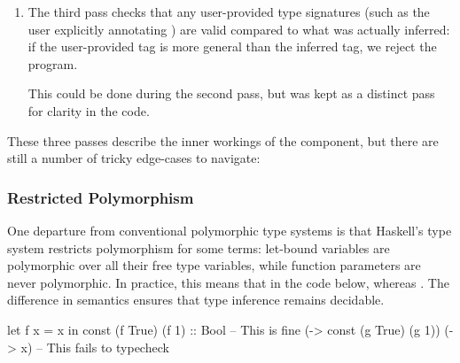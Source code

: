 \documentclass[dissertation.tex]{subfiles}
\begin{document}
{{\begin{enumerate}
{            This can't be done efficiently during the first pass: consider the expression  where the \(t_i\) are type variables tagging the expressions. Assume we have inferred that  and \haskell{(+) :: #\(\beta\rightarrow\beta\rightarrow\beta\)#} as described above, and that we have unified \(t_1\) and \(t_2\) with these types respectively. Inferring the type of the overall expression would proceed by unifying the type of the first formal argument of the function (\(\beta\)) with the first actual argument (\(\alpha\)), and then using this substitution to type the return value of the function as \(\alpha\rightarrow\alpha\rightarrow\alpha\), which we can now unify with \(t_3\). Had we previously updated the subterm's tags to be their inferred concrete types we would now have to update them again: \(\beta\) is no longer used as it's been unified with \(\alpha\), but our subterms may still contains uses of it.
        }
        \item
        {
            The third pass checks that any user-provided type signatures (such as the user explicitly annotating ) are valid compared to what was actually inferred: if the user-provided tag is more general than the inferred tag, we reject the program. 

            This could be done during the second pass, but was kept as a distinct pass for clarity in the code.
        }
        \end{enumerate}

        These three passes describe the inner workings of the component, but there are still a number of tricky edge-cases to navigate:

        \subsubsection{Restricted Polymorphism}
        {
            One departure from conventional polymorphic type systems is that Haskell's type system restricts polymorphism for some terms: let-bound variables are polymorphic over all their free type variables, while function parameters are never polymorphic. In practice, this means that in the code below,  whereas . The difference in semantics ensures that type inference remains decidable. 

            \begin{haskellfigure}
            let f x = x in const (f True) (f 1) :: Bool -- This is fine
            (\g -> const (g True) (g 1)) (\x -> x)      -- This fails to typecheck
            \end{haskellfigure}
        }
}}
\end{document}
